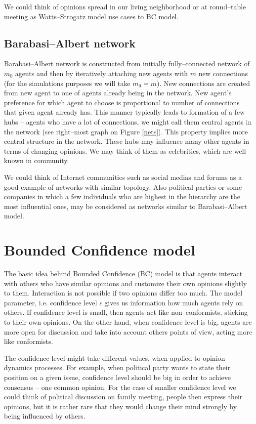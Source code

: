 \documentclass[a4paper, 12pt]{article}
\begin{document}
\indent
We could think of opinions spread in our living neighborhood or at round--table meeting as Watts--Strogatz model use cases to BC model.

\subsection{Barabasi--Albert network}
Barabasi--Albert network is constructed from initially fully--connected network of $m_0$ agents and then by iteratively attaching new agents with $m$ new connections (for the simulations purposes we will take $m_0=m$). New connections are created from new agent to one of agents already being in the network. New agent's preference for which agent to choose is proportional to number of connections that given agent already has. This manner typically leads to formation of a few hubs -- agents who have a lot of connections, we might call them central agents in the network (see right--most graph on Figure \ref{nets}). This property implies more central structure in the network. These hubs may influence many other agents in terms of changing opinions. We may think of them as celebrities, which are well--known in community. 

\indent
We could think of Internet communities such as social medias and forums as a good example of networks with similar topology. Also political parties or some companies in which a few individuals who are highest in the hierarchy are the most influential ones, may be considered as networks similar to Barabasi--Albert model.

\section{Bounded Confidence model}

The basic idea behind Bounded Confidence (BC) model \cite{bc} is that agents interact with others who have similar opinions and customize their own opinions slightly to them. Interaction is not possible if two opinions differ too much. The model parameter, i.e. confidence level $\epsilon$ gives us information how much agents rely on others. If confidence level is small, then agents act like non--conformists, sticking to their own opinions. On the other hand, when confidence level is big, agents are more open for discussion and take into account others points of view, acting more like conformists.
\indent

The confidence level might take different values, when applied to opinion dynamics processes. For example, when political party wants to state their position on a given issue, confidence level should be big in order to achieve consensus -- one common opinion. For the case of smaller confidence level we could think of political discussion on family meeting, people then express their opinions, but it is rather rare that they would change their mind strongly by being influenced by others.
\indent
\end{document}
